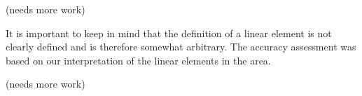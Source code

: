 \medskip
(needs more work)
\medskip

It is important to keep in mind that the definition of a linear element is not clearly defined and is therefore somewhat arbitrary. The accuracy assessment was based on our interpretation of the linear elements in the area. 

\medskip
(needs more work)
\medskip

